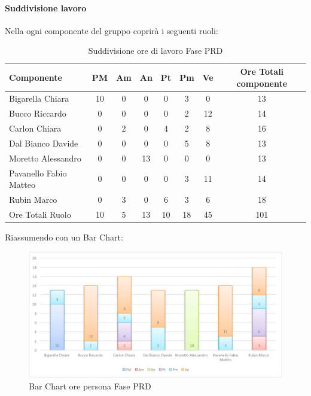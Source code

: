 			\paragraph{Suddivisione lavoro}
				Nella  ogni componente del gruppo \groupname{} coprirà i seguenti ruoli:
				\begin{table}[H]
					\begin{center}
						\begin{tabular}{| l | c | c | c | c | c | c | c |}
							\hline
							Componente 				& PM	& Am	& An 	& Pt 		& Pm 	& Ve 	& Ore Totali componente \\ \hline
							
							Bigarella Chiara 			& 10 		& 0		& 0		& 0		& 3 		& 0		& 13 \\
							Bucco Riccardo 			& 0		& 0		& 0		& 0		& 2		& 12 		& 14 \\
							Carlon Chiara	 			& 0		& 2 		& 0		& 4 		& 2 		& 8 		& 16 \\
							Dal Bianco Davide 			& 0		& 0		& 0		& 0		& 5 		& 8 		& 13 \\
							Moretto Alessandro 			& 0		& 0		& 13 		& 0		& 0		& 0		& 13 \\
							Pavanello Fabio Matteo	 	& 0		& 0		& 0		& 0		& 3 		&11 		& 14 \\
							Rubin Marco				& 0		& 3 		& 0		& 6 		& 3 		& 6		& 18 \\ \hline \hline
							
							Ore Totali Ruolo 			& 10 		& 5 		& 13 		& 10 		& 18 		& 45 		& 101\\ \hline
						\end{tabular}
					\end{center}
					\caption{Suddivisione ore di lavoro Fase PRD}
				\end{table}
				Riassumendo con un Bar Chart:
				\begin{figure}[H]\centering
					\includegraphics[width=\textwidth]{PianoDiProgetto/Pics/ChartOreFasePRD.pdf}
					\caption{Bar Chart ore persona Fase PRD}
				\end{figure}
